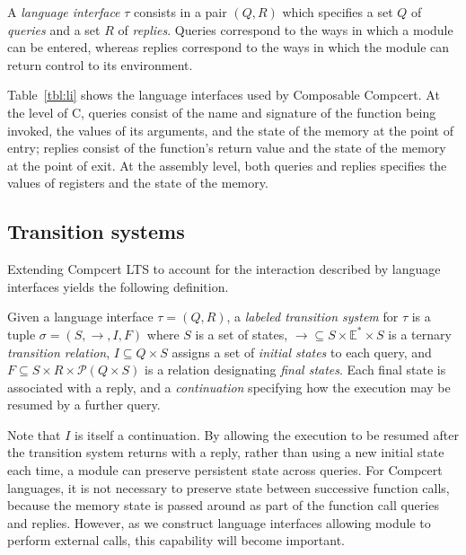 \begin{definition}
A \emph{language interface} $\tau$ consists in a pair $(Q, R)$
which specifies
a set $Q$ of \emph{queries} and
a set $R$ of \emph{replies}.
Queries
correspond to the ways in which
a module can be entered, whereas
replies
correspond to the ways in which
the module can return control
to its environment.
\end{definition}

Table~\ref{tbl:li}
shows the language interfaces used by Composable Compcert.
At the level of C,
queries consist of
the name and signature of the function being invoked,
the values of its arguments,
and the state of the memory at the point of entry;
replies
consist of the function's return value
and the state of the memory at the point of exit.
At the assembly level,
both queries and replies specifies
the values of registers and the state of the memory.


\subsection{Transition systems} %


Extending Compcert LTS to account for
the interaction described by language interfaces
yields the following definition.

\begin{definition}
Given a language interface $\tau = (Q, R)$,
a \emph{labeled transition system} for $\tau$
is a tuple $\sigma = (S, \rightarrow, I, F)$ where
$S$ is a set of states,
${\rightarrow} \subseteq S \times \mathbb{E}^* \times S$
is a ternary \emph{transition relation},
$I \subseteq Q \times S$
assigns a set of \emph{initial states} to each query, and
$F \subseteq S \times R \times \mathcal{P}(Q \times S)$
is a relation designating \emph{final states}.
Each final state is associated with a reply,
and a \emph{continuation} specifying
how the execution may be resumed by a further query.
\end{definition}

Note that $I$ is itself a continuation.
By allowing the execution to be resumed
after the transition system returns with a reply,
rather than using a new initial state each time,
a module can preserve persistent state across queries.
For Compcert languages,
it is not necessary to preserve state between successive function calls,
because the memory state is passed around
as part of the function call queries and replies.
However,
as we construct language interfaces
allowing module to perform external calls,
this capability will become important.

